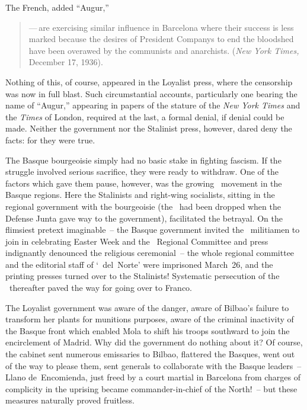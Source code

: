 \noindent
{}\indexNYT
The French, added ``Augur,\kn\kn''

\begin{quotation}
\noindent
—\,are exercising similar influence in Barcelona where their success is less marked because the desires of President Companys to end the bloodshed have been overawed by the communists and anarchists. (\emph{New York Times,} December 17, 1936).
\end{quotation}

Nothing of this, of course, appeared in the Loyalist press, where the censorship was now in full blast. Such circumstantial accounts, particularly one bearing the name of \kp ``\kn Augur\kn,\kn\kn'' appearing in papers of the stature of the \emph{New York Times} and the \emph{Times} of London, required at the last, a formal denial, if denial could be made. Neither the government nor the Stalinist press, however\kn, dared deny the facts: for they were true.

\indexCNT{}
The Basque bourgeoisie simply had no basic stake in fighting fascism. If the struggle involved serious sacrifice, they were ready to withdraw. One of the factors which gave them pause, however, was the growing \CNT\ movement in the Basque regions. Here the Stalinists and right-wing socialists, sitting in the regional government with the bourgeoisie (the \CNT\ had been dropped when the Defense Junta gave way to the government), facilitated the betrayal. On the flimsiest pretext imaginable~-- the Basque government invited the \CNT\ militiamen to join in celebrating Easter Week and the \CNT\ Regional Committee and press indignantly denounced the religious ceremonial~-- the whole regional committee and the editorial staff of `\CNT\ del~Norte' were imprisoned March~26, and the printing presses turned over to the Stalinists! Systematic persecution of the \CNT\ thereafter paved the way for going over to Franco.
\noclub

The Loyalist government was aware of the danger\kn, aware of Bilbao’s failure to transform her plants for munitions purposes, aware of the criminal inactivity of the Basque front which enabled Mola to shift his troops southward to join the encirclement of Madrid. Why did the government do nothing about it? Of course, the cabinet sent numerous emissaries to Bilbao, flattered the Basques, went out of the way to please them, sent generals to collaborate with the Basque leaders~-- Llano de~Encomienda, just freed by a court martial in Barcelona from charges of complicity in the uprising became commander-in-chief of the North!~-- but these measures naturally proved fruitless.

